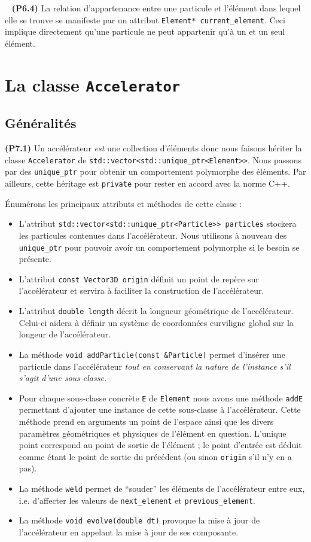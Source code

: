 \documentclass[12pt, letterpaper, twoside]{article}
\newcommand{\T}[1]{\texttt{#1}}
\begin{document}
\ \linebreak
\textbf{(P6.4)} La relation d'appartenance entre une particule et l'élément dans lequel elle se trouve se manifeste par un attribut \T{Element* current\_element}. Ceci implique directement qu'une particule ne peut appartenir qu'à un et un seul élément.

\section{La classe \T{Accelerator}}

\subsection{Généralités}
\noindent \textbf{(P7.1)} Un accélérateur \textit{est} une collection d'éléments donc nous faisons hériter la classe \T{Accelerator} de \T{std::vector<std::unique\_ptr<Element>>}. Nous passons par des \T{unique\_ptr} pour obtenir un comportement polymorphe des éléments. Par ailleurs, cette héritage est \T{private} pour rester en accord avec la norme C++.

Énumérons les principaux attributs et méthodes de cette classe :
\begin{itemize}
	\item L'attribut \T{std::vector<std::unique\_ptr<Particle>> particles} stockera les particules contenues dans l'accélérateur. Nous utilisons à nouveau des \T{unique\_ptr} pour pouvoir avoir un comportement polymorphe si le besoin se présente.
	\item L'attribut \T{const Vector3D origin} définit un point de repère sur l'accélérateur et servira à faciliter la construction de l'accélérateur.
	\item L'attribut \T{double length} décrit la longueur géométrique de l'accélérateur. Celui-ci aidera à définir un système de coordonnées curviligne global sur la longeur de l'accélérateur.
	\item La méthode \T{void addParticle(const \&Particle)} permet d'insérer une particule dans l'accélérateur \textit{tout en conservant la nature de l'instance s'il s'agit d'une sous-classe.}
	\item Pour chaque sous-classe concrète \T{E} de \T{Element} nous avons une méthode \T{addE} permettant d'ajouter une instance de cette sous-classe à l'accélérateur. Cette méthode prend en arguments un point de l'espace ainsi que les divers paramètres géométriques et physiques de l'élément en question. L'unique point correspond au point de sortie de l'élément ; le point d'entrée est déduit comme étant le point de sortie du précédent (ou sinon \T{origin} s'il n'y en a pas).
	\item La méthode \T{weld} permet de ``souder'' les éléments de l'accélérateur entre eux, i.e. d'affecter les valeurs de \T{next\_element} et \T{previous\_element}.

	\item La méthode \T{void evolve(double dt)} provoque la mise à jour de l'accélérateur en appelant la mise à jour de ses composante.
\end{itemize}
\end{document}
